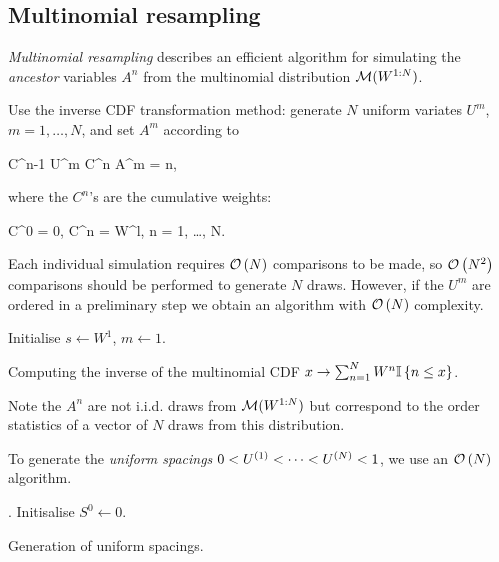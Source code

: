 \subsection{Multinomial resampling}

\textit{Multinomial resampling} describes an efficient algorithm for simulating the \textit{ancestor} variables $A^n$ from the multinomial distribution $\mathcal{M} (W^{1:N})$.

Use the inverse CDF transformation method: generate $N$ uniform variates $U^m$, $m = 1, \dots, N$, and set $A^m$ according to

\beq
  C^{n-1} \leq U^m \leq C^n \quad \iff \quad A^m = n,
\eeq

where the $C^n$'s are the cumulative weights:

\beq
  C^0 = 0, \quad C^n =  W^l, \quad n = 1, \dots, N.
\eeq

Each individual simulation requires $\mathcal{O}\left(N\right)$ comparisons to be made, so $\mathcal{O}\left(N^2\right)$ comparisons should be performed to generate $N$ draws. However, if the $U^m$ are ordered in a preliminary step we obtain an algorithm with $\mathcal{O}\left(N\right)$ complexity.

\begin{algorithm}[ht]
  \DontPrintSemicolon
  Initialise $s \leftarrow W^1$, $m \leftarrow 1$. \;
  \caption{Computing the inverse of the multinomial CDF $x \to \sum_{n=1}^{N} W^n \mathbb{I}\left\{n \leq x\right\}$.}
  \label{alg:icdf}
\end{algorithm}

Note the $A^n$ are not i.i.d. draws from $\mathcal{M}(W^{1:N})$ but correspond to the order statistics of a vector of $N$ draws from this distribution.

To generate the \textit{uniform spacings} $0 < U^{(1)} < \dots < U^{(N)} < 1$, we use an $\mathcal{O}\left(N\right)$ algorithm.

\begin{algorithm}[ht]
  \DontPrintSemicolon
  .
  Initisalise $S^0 \leftarrow 0.$ \;
  \caption{Generation of uniform spacings.}
  \label{alg:us}
\end{algorithm}

